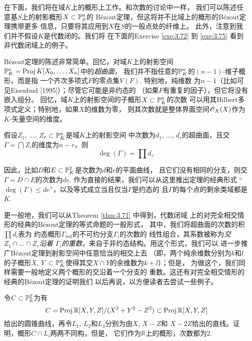 在下面，我们将在域$K$上的概形上工作。和次数的讨论中一样，
我们可以陈述任意基$S$上的射影概形$X\subset \P_S^n$的
B\'ezout定理，但这将并不比域上的概形的B\'ezout定理携带更多
信息，只要将其应用到$X$在$S$的一般点处的纤维上。
此外，注意到我们并不假设$K$是代数闭的。我们将
在下面的Exercise \ref{exe:3.72} 到 \ref{exe:3.75} 
看到非代数闭域上的例子。


B\'ezout定理的陈述非常简单。回忆，对域$K$上的射影空间
$\P_K^n=\proj K[X_0,\dots,X_n]$中的\textit{超曲面}，
我们并不指任意的$\P_K^n$的$(n-1)$-维子概形，而是指
一个齐次多项式$F$的零点集$V(F)$. 特别地，纯维数
为$n-1$（比如可见Eisenbud [1995]）；尽管它可能是非约态的
（如果$F$有重复的因子），但它将没有嵌入组分。
回忆，域$K$上的射影空间的子概形$X\subset \P_K^n$的次数
可以用其Hilbert多项式定义；特别地，如果$X$的维数为零，
则其次数就是整体界面空间$\oo_X(X)$作为$K$-矢量空间的维度。

\begin{thm}
\label{thm:3.71}
假设$Z_1$, $\dots$, $Z_r\subset \P_K^n$是域$K$上的射影空间
中次数为$d_1$, $\dots$, $d_r$的超曲面，且交
$\Gamma=\bigcap Z_i$的维度为$n-r$，则
\[
	\deg(\Gamma)=\prod d_i.
\]
\end{thm}

因此，比如$D$和$E\subset \P_K^2$是次数为$d$和$e$的平面曲线，
且它们没有相同的分支，则交$\Gamma=D\cap E$的次数为$de$. 
作为直接的结果，我们可以从这里推出定理的经典形式
“$\deg(\Gamma)\leq de$”，以及等式成立当且仅当$\Gamma$是约态的
且$\Gamma$的每个点的剩余类域都是$K$.

更一般地，我们可以从Theorem \ref{thm:3.71} 中得到，代数闭域
上的对完全相交情形的经典的B\'ezout定理的等式命题的一般形式，
其中，我们将超曲面的次数的积$\prod d_i$表为
约态概形$\Gamma_{\text{red}}$的不可约分支$\Gamma_i$的次数的
线性组合，其系数被称为\textit{交$Z_1\cap \dots\cap Z_r$沿着
$\Gamma_i$的重数}，来自于非约态结构。用这个形式，我们可以
进一步推广B\'ezout定理到射影空间中任意恰当的相交上去
（即，两个纯余维数分别为$k$和$l$的子概形$X$, 
$Y\subset \P_K^n$使得其交$X\cap Y$的余维数为$k+l$）；但是，
为做这个，我们同样需要一般地定义两个概形的交沿着一个分支的
重数。这还有对完全相交情形的经典的B\'ezout定理的证明我们
以后再说，以方便读者去尝试一些例子。

\begin{exe}\label{exe:3.72}
令$C\subset \P_{\mathbb R}^2$为有
\[
	C=\proj \mathbb R[X,Y,Z]/(X^2+Y^2-Z^2)
	\subset \proj \mathbb R[X,Y,Z]
\]
给出的圆锥曲线，再令$L_1$, $L_2$和$L_3$分别为由$X$, $X-Z$和
$X-2Z$给出的直线。证明，概形$C\cap L_i$两两不同构，但是，
它们作为$\mathbb R$上的概形，次数都为$2$.
\end{exe}

